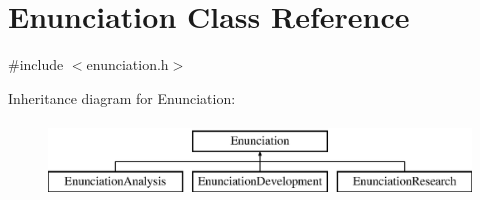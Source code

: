 \hypertarget{class_enunciation}{}\section{Enunciation Class Reference}
\label{class_enunciation}


{\ttfamily \#include $<$enunciation.\+h$>$}

Inheritance diagram for Enunciation\+:\begin{figure}[H]
\begin{center}
\leavevmode
\includegraphics[height=2.000000cm]{class_enunciation}
\end{center}
\end{figure}
